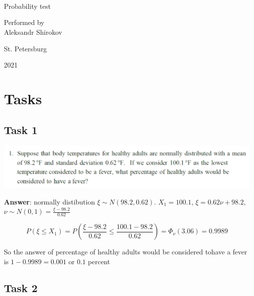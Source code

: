 \documentclass[%
12pt, %
final, %
oneside, %
onecolumn, %
centertags]{article} %
\theoremstyle{plain}
\theoremstyle{definition}
\theoremstyle{remark}
\begin{document}
	\begin{titlepage} 
		\begin{center}
		\textbf{}\\[2.0cm]
		\LARGE \ \\[0.5cm]
		\Large \  \\[3cm]
		\LARGE Probability test


		\begin{flushright}
		Performed by\\
		Aleksandr Shirokov\\

		\end{flushright}

		\vfill 

		{\Large {St. Petersburg}} \par
		{\Large {2021}}
		\end{center} 
	\end{titlepage}

\tableofcontents
\newpage


\section{Tasks}


\subsection{Task 1}

\begin{center}
\includegraphics[scale=0.9]{1.png}
\end{center}

\textbf{Answer}: normally distibution $\xi \sim N(98.2, 0.62)$. $X_1 = 100.1$, $\xi = 0.62\nu + 98.2$, $\nu \sim N(0, 1) = \frac{\xi - 98.2}{0.62}$

$$P\left(\xi \leq X_1 \right) = P\left(\frac{\xi - 98.2}{0.62} \leq \frac{100.1 - 98.2}{0.62}\right) = \Phi_{\nu}(3.06) = 0.9989$$

So the answer of percentage of healthy adults would be considered tohave a fever is $1 - 0.9989 = 0.001$ or $0.1$ percent

\subsection{Task 2}
\end{document}
